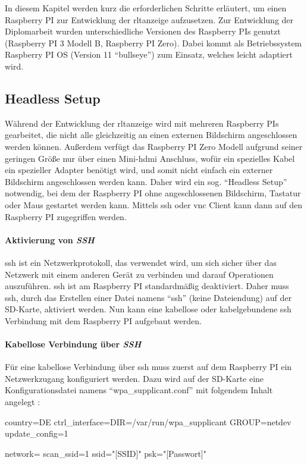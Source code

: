 \label{raspi_setup}
In diesem Kapitel werden kurz die erforderlichen Schritte erläutert, um einen Raspberry PI zur Entwicklung der \ac{rltanzeige} aufzusetzen.
Zur Entwicklung der Diplomarbeit wurden unterschiedliche Versionen des Raspberry PIs genutzt (Raspberry PI 3 Modell B, Raspberry PI Zero). Dabei kommt als Betriebssystem Raspberry PI OS (Version 11 \enquote{bullseye}) zum Einsatz, welches leicht adaptiert wird.

\subsection{Headless Setup}\label{raspi_headless_setup}
Während der Entwicklung der \ac{rltanzeige} wird mit mehreren Raspberry PIs gearbeitet, die nicht alle gleichzeitig an einen externen Bildschirm angeschlossen werden können. Außerdem verfügt das Raspberry PI Zero Modell aufgrund seiner geringen Größe nur über einen Mini-\ac{hdmi} Anschluss, wofür ein spezielles Kabel \bzw ein spezieller Adapter benötigt wird, und somit nicht einfach ein externer Bildschirm angeschlossen werden kann. Daher wird ein sog. \enquote{Headless Setup} notwendig, bei dem der Raspberry PI ohne angeschlossenen Bildschirm, Tastatur oder Maus gestartet werden kann. Mittels \ac{ssh} oder \ac{vnc} Client kann dann auf den Raspberry PI zugegriffen werden.
\cite[vgl.][]{Piltch:2022}

\paragraph{Aktivierung von \textit{SSH}}
\ac{ssh} ist ein Netzwerkprotokoll, das verwendet wird, um sich sicher über das Netzwerk mit einem anderen Gerät zu verbinden und darauf Operationen auszuführen. \ac{ssh} ist am Raspberry PI standardmäßig deaktiviert.  Daher muss \ac{ssh}, durch das Erstellen einer Datei namens \enquote{ssh} (keine Dateiendung) auf der SD-Karte, aktiviert werden. Nun kann eine kabellose oder kabelgebundene \ac{ssh} Verbindung mit dem Raspberry PI aufgebaut werden.

\paragraph{Kabellose Verbindung über \textit{SSH}}
Für eine kabellose Verbindung über \ac{ssh} muss zuerst auf dem Raspberry PI ein Netzwerkzugang konfiguriert werden. Dazu wird auf der SD-Karte eine Konfigurationsdatei namens \enquote{wpa\_supplicant.conf} mit folgendem Inhalt angelegt \cite[vgl.][]{Piltch:2022}:
\begin{textcode}
country=DE
ctrl_interface=DIR=/var/run/wpa_supplicant GROUP=netdev
update_config=1

network={
    scan_ssid=1
    ssid="[SSID]"
    psk="[Passwort]"
}
\end{textcode}

